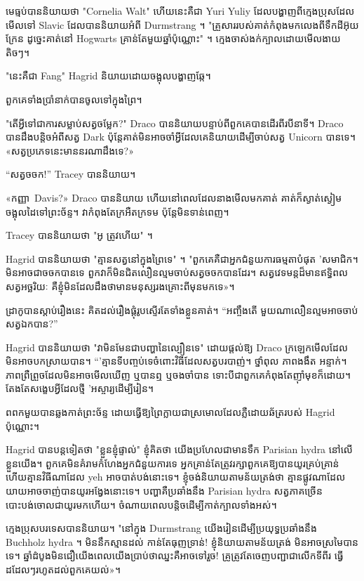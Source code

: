 មេធ្មប់បាននិយាយថា "Cornelia Walt" ហើយនេះគឺជា Yuri Yuliy ដែលបង្ហាញពីក្មេងប្រុសដែលមើលទៅ Slavic ដែលបាននិយាយអំពី Durmstrang ។ "គ្រួសាររបស់គាត់កំពុងមកលេងពីទឹកដីអ៊ុយក្រែន ដូច្នេះគាត់នៅ Hogwarts គ្រាន់តែមួយឆ្នាំប៉ុណ្ណោះ" ។ ក្មេងចាស់ងក់ក្បាលដោយមើលងាយតិចៗ។

"នេះគឺជា Fang" Hagrid និយាយដោយចង្អុលបង្ហាញឆ្កែ។

ពួកគេទាំងប្រាំនាក់បានចូលទៅក្នុងព្រៃ។

"តើអ្វីទៅជាការសម្លាប់សត្វចម្លែក?" Draco បាននិយាយបន្ទាប់ពីពួកគេបានដើរពីរបីនាទី។ Draco បានដឹងបន្តិចអំពីសត្វ Dark ប៉ុន្តែគាត់មិនអាចចាំអ្វីដែលគេនិយាយដើម្បីចាប់សត្វ Unicorn បានទេ។ «​សត្វ​ប្រភេទ​នេះ​មាន​នរណា​ដឹង​ទេ​?»

“សត្វចចក!” Tracey បាននិយាយ។

«កញ្ញា~Davis?» Draco បាននិយាយ ហើយនៅពេលដែលនាងមើលមកគាត់ គាត់ក៏ស្ងាត់ស្ងៀម ចង្អុលដៃទៅព្រះច័ន្ទ។ វា​កំពុង​តែ​ក្រអឺតក្រទម ប៉ុន្តែ​មិន​ទាន់​ពេញ។

Tracey បាននិយាយថា "អូ ត្រូវហើយ" ។

Hagrid បាននិយាយថា "គ្មានសត្វនៅក្នុងព្រៃទេ" ។ "ពួកគេគឺជាអ្នកជំនួយការធម្មតាបំផុត 'សមាជិក។ មិន​អាច​ជា​ចចក​បាន​ទេ ពួក​វា​ក៏​មិន​ជិត​លឿន​ល្មម​ចាប់​សត្វ​ចចក​បាន​ដែរ។ សត្វ​វេទមន្ត​ដ៏​មាន​ឥទ្ធិពល សត្វ​អច្ឆរិយៈ គឺ​ខ្ញុំ​មិន​ដែល​ដឹង​ថា​មាន​មនុស្ស​រង​គ្រោះ​ពី​មុន​មក​ទេ»។

ដ្រាកូបានស្តាប់រឿងនេះ គិតដល់រឿងផ្ដុំរូបស្ទើរតែទាំងខ្លួនគាត់។ “អញ្ចឹងតើ \emph{} មួយណាលឿនល្មមអាចចាប់សត្វឯកបាន?”

Hagrid បាននិយាយថា "វាមិនមែនជាបញ្ហានៃល្បឿនទេ" ដោយផ្តល់ឱ្យ Draco ក្រឡេកមើលដែលមិនអាចបកស្រាយបាន។ “'គ្មានទីបញ្ចប់ទេចំពោះវិធីដែលសត្វបរបាញ់។ ថ្នាំពុល ភាពងងឹត អន្ទាក់។ ភាពព្រឺព្រួច​ដែល​មិន​អាច​មើល​ឃើញ ឬ​បាន​ឮ ឬ​ចងចាំ​បាន ទោះ​បី​ជា​ពួកគេ​កំពុង​តែ​ញ៉ាំ​មុខ​ក៏​ដោយ។ តែងតែសង្ខេបអ្វីដែលថ្មី 'អស្ចារ្យដើម្បីរៀន។

ពពក​មួយ​បាន​ឆ្លង​កាត់​ព្រះ​ច័ន្ទ ដោយ​ធ្វើ​ឱ្យ​ព្រៃ​ក្លាយ​ជា​ស្រមោល​ដែល​ភ្លឺ​ដោយ​ឆ័ត្រ​របស់ Hagrid ប៉ុណ្ណោះ។

Hagrid បានបន្តទៀតថា "ខ្លួនខ្ញុំផ្ទាល់" ខ្ញុំគិតថា យើងប្រហែលជាមានទឹក Parisian hydra នៅលើខ្លួនយើង។ ពួកគេមិនគំរាមកំហែងអ្នកជំនួយការទេ អ្នកគ្រាន់តែត្រូវរក្សាពួកគេឱ្យបានយូរគ្រប់គ្រាន់ ហើយគ្មានវិធីណាដែល yeh អាចបាត់បង់នោះទេ។ ខ្ញុំ​ចង់​និយាយ​តាម​ន័យ​ត្រង់​ថា គ្មាន​ផ្លូវ​ណា​ដែល​យាយ​អាច​ចាញ់​បាន​យូរ​អង្វែង​នោះ​ទេ។ បញ្ហាគឺប្រឆាំងនឹង Parisian hydra សត្វភាគច្រើនបោះបង់ចោលជាយូរមកហើយ។ ចំណាយ​ពេល​បន្តិច​ដើម្បី​កាត់​ក្បាល​ទាំង​អស់។

ក្មេងប្រុសបរទេសបាននិយាយ។ "នៅក្នុង Durmstrang យើងរៀនដើម្បីប្រយុទ្ធប្រឆាំងនឹង Buchholz hydra ។ មិននឹកស្មានដល់ កាន់តែធុញទ្រាន់! ខ្ញុំ​និយាយ​តាម​ន័យ​ត្រង់ មិន​អាច​ស្រមៃ​បាន​ទេ។ ឆ្នាំ​ដំបូង​មិន​ជឿ​យើង​ពេល​យើង​ប្រាប់​ថា​ឈ្នះ​គឺ​អាច​ទៅ​រួច! គ្រូ​ត្រូវ​តែ​ចេញ​បញ្ជា​ជា​លើក​ទី​ពីរ ធ្វើ​ដដែលៗ​រហូត​ដល់​ពួក​គេ​យល់»។

